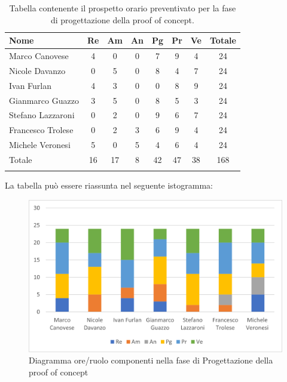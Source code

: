 \begin{longtable}{|l|c|c|c|c|c|c|c|}
	\hline
	\rowcolor{lighter-grayer}
	\textbf{Nome}     & \textbf{Re} & \textbf{Am} & \textbf{An} & \textbf{Pg} & \textbf{Pr} & \textbf{Ve} & \textbf{Totale} \\
	\hline
	\endfirsthead

	\hline
	Marco Canovese    & 4           & 0           & 0           & 7           & 9           & 4           & 24              \\
	\hline
	\hline
	Nicole Davanzo    & 0           & 5           & 0           & 8           & 4           & 7           & 24              \\
	\hline
	\hline
	Ivan Furlan       & 4           & 3           & 0           & 0           & 8           & 9           & 24              \\
	\hline
	\hline
	Gianmarco Guazzo  & 3           & 5           & 0           & 8           & 5           & 3           & 24              \\
	\hline
	\hline
	Stefano Lazzaroni & 0           & 2           & 0           & 9           & 6           & 7           & 24              \\
	\hline
	\hline
	Francesco Trolese & 0           & 2           & 3           & 6           & 9           & 4           & 24              \\
	\hline
	\hline
	Michele Veronesi  & 5           & 0           & 5           & 4           & 6           & 4           & 24              \\
	\hline
	\hline
	Totale            & 16          & 17          & 8           & 42          & 47          & 38          & 168             \\
	\hline
	\rowcolor{white}
	\caption{Tabella contenente il prospetto orario preventivato per la fase di progettazione della proof of concept.}
\end{longtable}


La tabella può essere riassunta nel seguente istogramma:

\begin{figure}[H]
	\centering
	\includegraphics[width=0.8\linewidth]{res/images/preventivo/4-1.png}
	\caption{Diagramma ore/ruolo componenti nella fase di Progettazione della proof of concept}
	\label{fig:diagramma suddivisione ruoli fase progettazione della proof of concept}
\end{figure}


